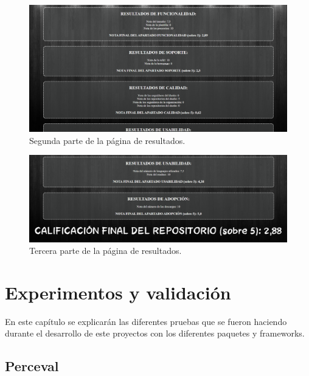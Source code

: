 \documentclass[a4paper, 12pt]{book}
\begin{document}
\begin{figure}
    
    \includegraphics[bb=0 0 800 600, width=12cm, keepaspectratio]{img/resultados_2.png}
    \caption{Segunda parte de la página de resultados.}\label{fig:resultados_2}
\end{figure}

\begin{figure}
    
    \includegraphics[bb=0 0 800 600, width=12cm, keepaspectratio]{img/resultados_3.png}
    \caption{Tercera parte de la página de resultados.}\label{fig:resultados_3}
\end{figure}



\cleardoublepage
\chapter{Experimentos y validación}

En este capítulo se explicarán las diferentes pruebas que se fueron haciendo durante el desarrollo de este proyectos con los diferentes paquetes y frameworks.

\section{Perceval}
\end{document}

